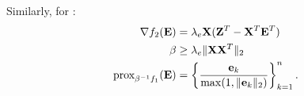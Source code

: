 Similarly, for :
\begin{align}
	\nabla f_2(\mathbf{E}) &= \lambda_e \mathbf{X} (\mathbf{Z}^T - \mathbf{X}^T \mathbf{E}^T) \\
	\beta &\geq \lambda_e \| \mathbf{X} \mathbf{X}^T \|_2 \\
	\text{prox}_{\beta^{-1} f_1}(\mathbf{E}) &= \left\{ \frac{\mathbf{e}_k}{\max(1, \|\mathbf{e}_k\|_2)} \right\}_{k=1}^n.
\end{align}




